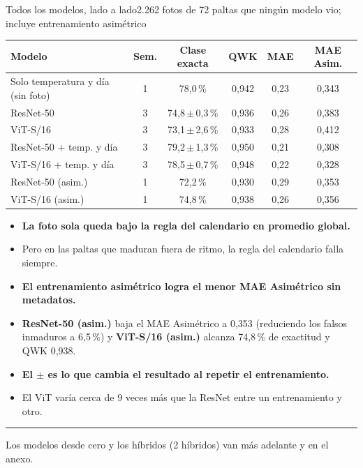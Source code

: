 \documentclass[aspectratio=169,11pt,table]{beamer}
\newcommand{\cierre}[1]{%
  \vfill
  {\color{verdecla}\rule{2.5pt}{0.9em}}\hspace{0.4em}%
  {\footnotesize\color{grisSuave}#1}%
}
\begin{document}
\begin{frame}{Todos los modelos, lado a lado}{2.262 fotos de 72 paltas que ningún modelo vio; incluye entrenamiento asimétrico}
{\tiny
\centering
\begin{tabular}{lccccc}
\toprule
\rowcolor{verdeosc}\color{white}\bfseries Modelo & \color{white}\bfseries Sem. & \color{white}\bfseries Clase exacta & \color{white}\bfseries QWK & \color{white}\bfseries MAE & \color{white}\bfseries MAE Asim. \\
\midrule
Solo temperatura y día (sin foto) & 1 & 78{,}0\,\% & 0{,}942 & 0{,}23 & 0{,}343 \\
ResNet-50 & 3 & 74{,}8\,$\pm$\,0{,}3\,\% & 0{,}936 & 0{,}26 & 0{,}383 \\
ViT-S/16 & 3 & 73{,}1\,$\pm$\,2{,}6\,\% & 0{,}933 & 0{,}28 & 0{,}412 \\
\rowcolor{verdecla!22}ResNet-50 + temp. y día & 3 & 79{,}2\,$\pm$\,1{,}3\,\% & 0{,}950 & 0{,}21 & 0{,}308 \\
ViT-S/16 + temp. y día & 3 & 78{,}5\,$\pm$\,0{,}7\,\% & 0{,}948 & 0{,}22 & 0{,}328 \\
ResNet-50 (asim.) & 1 & 72{,}2\,\% & 0{,}930 & 0{,}29 & 0{,}353 \\
ViT-S/16 (asim.) & 1 & 74{,}8\,\% & 0{,}938 & 0{,}26 & 0{,}356 \\
\bottomrule
\end{tabular}
}
\vspace{0.3em}
{\tiny
\setlength{\itemsep}{0.12em}
\begin{itemize}
  \item {\bfseries La foto sola queda bajo la regla del calendario en promedio global.}
  \item Pero en las paltas que maduran fuera de ritmo, la regla del calendario falla siempre.
  \item {\bfseries El entrenamiento asimétrico logra el menor MAE Asimétrico sin metadatos.}
  \item \textbf{ResNet-50 (asim.)} baja el MAE Asimétrico a 0,353 (reduciendo los falsos inmaduros a 6,5\,\%) y \textbf{ViT-S/16 (asim.)} alcanza 74,8\,\% de exactitud y QWK 0,938.
  \item {\bfseries El $\pm$ es lo que cambia el resultado al repetir el entrenamiento.}
  \item El ViT varía cerca de 9 veces más que la ResNet entre un entrenamiento y otro.
\end{itemize}
}
\cierre{Los modelos desde cero y los híbridos (2 híbridos) van más adelante y en el anexo.}
\end{frame}
\end{document}
